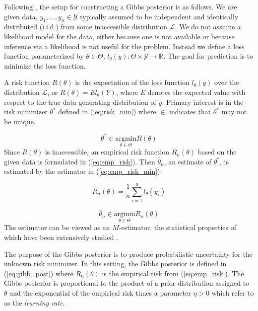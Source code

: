 Following \cite{martin2022direct}, the setup for constructing a Gibbs posterior 
is as follows. We are given data, 
$y_1, ..., y_n \in \mathcal{Y}$ typically assumed to be independent and 
identically distributed (i.i.d.) from some inaccessible distribution 
$\mathcal{L}$. We do not assume a likelihood model for the data, either 
because one is not available or because inference via a likelihood is not 
useful for the problem. Instead we define a loss function parameterized by 
$\theta \in \Theta$, 
$l_{\theta}(y) : \Theta \times \mathcal{Y} \rightarrow \mathbb{R}$. 
The goal for prediction is to minimize the loss function. 


A risk function $R(\theta)$ is the expectation of the loss function 
$l_{\theta}(y)$ over the distribution $\mathcal{L}$, or 
$R(\theta) = E l_{\theta}(Y)$, where $E$ denotes the expected value with 
respect to the true data generating distribution of $y$.
Primary interest is in the risk minimizer 
$\theta^*$ defined in (\ref{eq:risk_min}) where $\in$ indicates that 
$\theta^*$ may not be unique.

\begin{equation}
    \label{eq:risk_min}
    \theta^* \in \underset{\theta \in \Theta}{\mathrm{argmin}} R(\theta)
\end{equation}
Since $R(\theta)$ is inaccessible, an empirical risk function $R_n(\theta)$ 
based on the given data is formulated in (\ref{eq:emp_risk}). Then 
$\hat{\theta}_n$, an estimate of $\theta^*$,  is estimated by the estimator 
in (\ref{eq:emp_risk_min}).  

\begin{equation}
\label{eq:emp_risk}
    R_n(\theta) = \frac{1}{n}\sum_{i = 1}^n l_{\theta}(y_i)
\end{equation}

\begin{equation}
    \label{eq:emp_risk_min}
    \hat{\theta}_n \in \underset{\theta \in \Theta}{\mathrm{arg min}} R_n(\theta)
\end{equation}
The estimator can be viewed as an $M$-estimator, the statistical properties 
of which have been extensively studied \cite[]{boos2013essential, 
van1998asymptotic}. 







The purpose of the Gibbs posterior is to produce probabilistic uncertainty 
for the unknown risk minimizer. In this setting, the Gibbs 
posterior is defined in (\ref{eq:gibb_post}) where $R_n(\theta)$ 
is the empirical 
risk from (\ref{eq:emp_risk}). The Gibbs posterior is proportional to the 
product of a prior distribution assigned to $\theta$ and the exponential of 
the empirical risk times a parameter $\eta > 0$ which \cite{martin2022direct} 
refer to as the \textit{learning rate}. 

